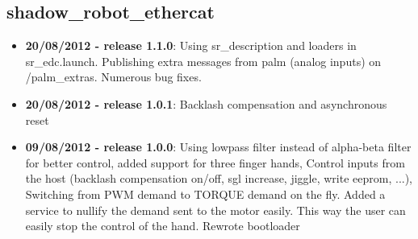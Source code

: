 
\subsection{shadow\_robot\_ethercat}
\label{sec:shadow-robot-ethercat-changelog}

\begin{itemize}
\item \textbf{20/08/2012 - release 1.1.0}: Using sr\_description and loaders in sr\_edc.launch. Publishing extra messages from palm (analog inputs) on /palm\_extras. Numerous bug fixes.
\item \textbf{20/08/2012 - release 1.0.1}: Backlash compensation and asynchronous reset
\item \textbf{09/08/2012 - release 1.0.0}: Using lowpass filter instead of alpha-beta filter for better control, added support for three finger hands, Control inputs from the host (backlash compensation on/off, sgl increase, jiggle, write eeprom, ...), Switching from PWM demand to TORQUE demand on the fly. Added a service to nullify the demand sent to the motor easily. This way the user can easily stop the control of the hand. Rewrote bootloader
\end{itemize}
